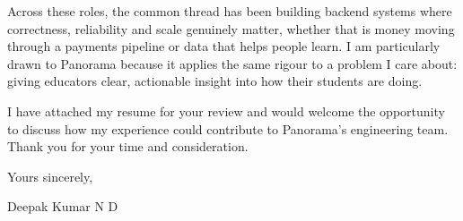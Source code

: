 \documentclass[11pt,a4paper]{article}
\begin{document}
Across these roles, the common thread has been building backend systems where correctness, reliability and scale genuinely matter, whether that is money moving through a payments pipeline or data that helps people learn. I am particularly drawn to Panorama because it applies the same rigour to a problem I care about: giving educators clear, actionable insight into how their students are doing.

I have attached my resume for your review and would welcome the opportunity to discuss how my experience could contribute to Panorama's engineering team. Thank you for your time and consideration.

Yours sincerely,

\vspace{6pt}
Deepak Kumar N D
\end{document}
